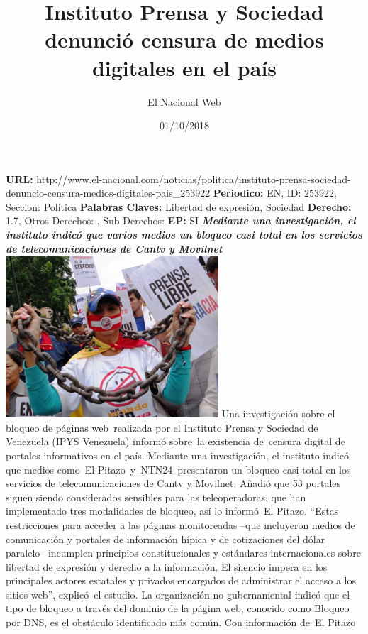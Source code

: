 \documentclass{article}%
\title{\textbf{Instituto Prensa y Sociedad denunció censura de medios digitales en el país}}%
\author{El Nacional Web}%
\date{01/10/2018}%
\begin{document}
%
\normalsize%
\maketitle%
\textbf{URL: }%
http://www.el{-}nacional.com/noticias/politica/instituto{-}prensa{-}sociedad{-}denuncio{-}censura{-}medios{-}digitales{-}pais\_253922\newline%
%
\textbf{Periodico: }%
EN, %
ID: %
253922, %
Seccion: %
Política\newline%
%
\textbf{Palabras Claves: }%
Libertad de expresión, Sociedad\newline%
%
\textbf{Derecho: }%
1.7, %
Otros Derechos: %
, %
Sub Derechos: %
\newline%
%
\textbf{EP: }%
SI\newline%
\newline%
%
\textbf{\textit{Mediante una investigación, el instituto indicó que varios medios un bloqueo casi total en los servicios de telecomunicaciones de Cantv y Movilnet}}%
\newline%
\newline%
%
\includegraphics[width=300px]{113.jpg}%
\newline%
%
Una investigación sobre el bloqueo de páginas web~realizada por el Instituto Prensa y Sociedad de Venezuela (IPYS Venezuela) informó sobre~la existencia de~censura digital de portales informativos en el país.%
\newline%
%
Mediante una investigación, el instituto indicó que medios como~El Pitazo~y~NTN24~presentaron un bloqueo casi total en los servicios de telecomunicaciones de Cantv y Movilnet. Añadió que 53 portales siguen siendo considerados sensibles para las teleoperadoras, que han implementado tres modalidades de bloqueo, así lo informó~El Pitazo.%
\newline%
%
“Estas restricciones para acceder a las páginas monitoreadas –que incluyeron medios de comunicación y portales de información hípica y de cotizaciones del dólar paralelo– incumplen principios constitucionales y estándares internacionales sobre libertad de expresión y derecho a la información. El silencio impera en los principales actores estatales y privados encargados de administrar el acceso a los sitios web”, explicó~el estudio.%
\newline%
%
La organización no gubernamental indicó que el tipo de bloqueo a través del dominio de la página web, conocido como Bloqueo por DNS, es el obstáculo identificado más común.%
\newline%
%
Con información de~El Pitazo%
\newline%
%
\end{document}
